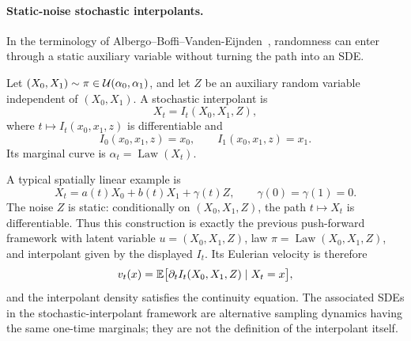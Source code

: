 \paragraph{Static-noise stochastic interpolants.}
In the terminology of Albergo--Boffi--Vanden-Eijnden~\cite{Albergo2025StochasticInterpolants}, randomness can enter through a static auxiliary variable without turning the path into an SDE.
\begin{defn}\label{def-stochastic-interpolant}
Let \((X_0,X_1)\sim\pi\in\mathcal{U}(\alpha_0,\alpha_1)\), and let \(Z\) be an auxiliary random variable independent of \((X_0,X_1)\). A stochastic interpolant is
\[
    X_t = I_t(X_0,X_1,Z),
\]
where $t\mapsto I_t(x_0,x_1,z)$ is differentiable and
\[
    I_0(x_0,x_1,z)=x_0,
    \qquad
    I_1(x_0,x_1,z)=x_1.
\]
Its marginal curve is \(\alpha_t=\operatorname{Law}(X_t)\).
\end{defn}
A typical spatially linear example is
\[
    X_t=a(t)X_0+b(t)X_1+\gamma(t)Z,
    \qquad
    \gamma(0)=\gamma(1)=0.
\]
The noise $Z$ is static: conditionally on $(X_0,X_1,Z)$, the path $t\mapsto X_t$ is differentiable. Thus this construction is exactly the previous push-forward framework with latent variable $u=(X_0,X_1,Z)$, law $\pi=\operatorname{Law}(X_0,X_1,Z)$, and interpolant given by the displayed $I_t$. Its Eulerian velocity is therefore
\[
    v_t(x)=\mathbb{E}\bigl[\partial_t I_t(X_0,X_1,Z)\mid X_t=x\bigr],
\]
and the interpolant density satisfies the continuity equation. The associated SDEs in the stochastic-interpolant framework are alternative sampling dynamics having the same one-time marginals; they are not the definition of the interpolant itself.

